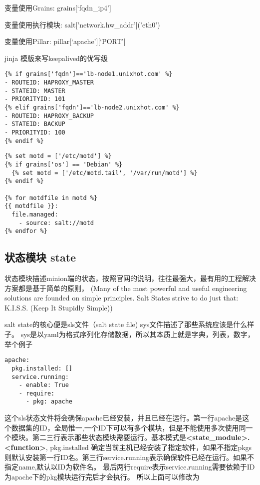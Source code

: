 变量使用Grains: {{ grains[‘fqdn_ip4’] }}

变量使用执行模块: {{ salt['network.hw_addr']('eth0') }}

变量使用Pillar: {{ pillar[‘apache'][‘PORT'] }}

jinja 模版来写keepalived的优写级

\begin{lstlisting}
{% if grains['fqdn']=='lb-node1.unixhot.com' %}
- ROUTEID: HAPROXY_MASTER
- STATEID: MASTER
- PRIORITYID: 101
{% elif grains['fqdn']=='lb-node2.unixhot.com' %}
- ROUTEID: HAPROXY_BACKUP
- STATEID: BACKUP
- PRIORITYID: 100
{% endif %}
\end{lstlisting}

\begin{lstlisting}
{% set motd = ['/etc/motd'] %}
{% if grains['os'] == 'Debian' %}
  {% set motd = ['/etc/motd.tail', '/var/run/motd'] %}
{% endif %}

{% for motdfile in motd %}
{{ motdfile }}:
  file.managed:
    - source: salt://motd
{% endfor %}
\end{lstlisting}

\subsection{状态模块 state}

状态模块描述minion端的状态，按照官网的说明，往往最强大，最有用的工程解决方案都是基于简单的原则，
(Many of the most powerful and useful engineering solutions are founded on simple principles. Salt States strive to do just that: K.I.S.S. (Keep It Stupidly Simple))

salt state的核心便是sls文件（salt state file) sys文件描述了那些系统应该是什么样子。 sys是以yaml为格式序列化存储数据，所以其本质上就是字典，列表，数字，举个例子

\begin{lstlisting}
apache:
  pkg.installed: []
  service.running:
    - enable: True
    - require:
      - pkg: apache
\end{lstlisting}

这个sls状态文件将会确保apache已经安装，并且已经在运行。第一行apache是这个数据集的ID，全局惟一,一个ID下可以有多个模块，但是不能使用多次使用同一个模块。第二三行表示那些状态模块需要运行。基本模式是\textbf{<state_module>.<function>}, pkg.installed 确定当前主机已经安装了指定软件，如果不指定pkgs则默认安装第一行ID名。第三行service.running表示确保软件已经在运行。如果不指定name,默认以ID为软件名。
最后两行require表示service.running需要依赖于ID为apache下的pkg模块运行完后才会执行。 所以上面可以修改为

